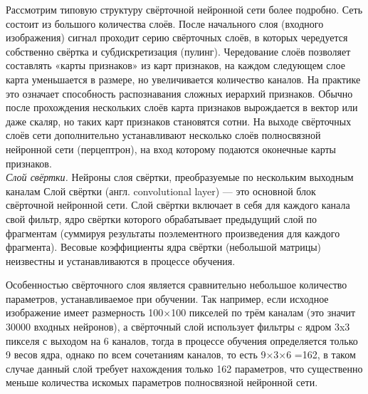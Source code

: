 \documentclass{article}
\begin{document}
Рассмотрим типовую структуру свёрточной нейронной сети более подробно. Сеть состоит из большого количества слоёв. После начального слоя (входного изображения) сигнал проходит серию свёрточных слоёв, в которых чередуется собственно свёртка и субдискретизация (пулинг). Чередование слоёв позволяет составлять «карты признаков» из карт признаков, на каждом следующем слое карта уменьшается в размере, но увеличивается количество каналов. На практике это означает способность распознавания сложных иерархий признаков. Обычно после прохождения нескольких слоёв карта признаков вырождается в вектор или даже скаляр, но таких карт признаков становятся сотни. На выходе свёрточных слоёв сети дополнительно устанавливают несколько слоёв полносвязной нейронной сети (перцептрон), на вход которому подаются оконечные карты признаков. \\

\textit{Слой свёртки. }Нейроны слоя свёртки, преобразуемые по нескольким выходным каналам
Слой свёртки (англ. convolutional layer) — это основной блок свёрточной нейронной сети. Слой свёртки включает в себя для каждого канала свой фильтр, ядро свёртки которого обрабатывает предыдущий слой по фрагментам (суммируя результаты поэлементного произведения для каждого фрагмента). Весовые коэффициенты ядра свёртки (небольшой матрицы) неизвестны и устанавливаются в процессе обучения.

Особенностью свёрточного слоя является сравнительно небольшое количество параметров, устанавливаемое при обучении. Так например, если исходное изображение имеет размерность 100×100 пикселей по трём каналам (это значит 30000 входных нейронов), а свёрточный слой использует фильтры c ядром 3x3 пикселя с выходом на 6 каналов, тогда в процессе обучения определяется только 9 весов ядра, однако по всем сочетаниям каналов, то есть 9×3×6 =162, в таком случае данный слой требует нахождения только 162 параметров, что существенно меньше количества искомых параметров полносвязной нейронной сети. \\
\end{document}
